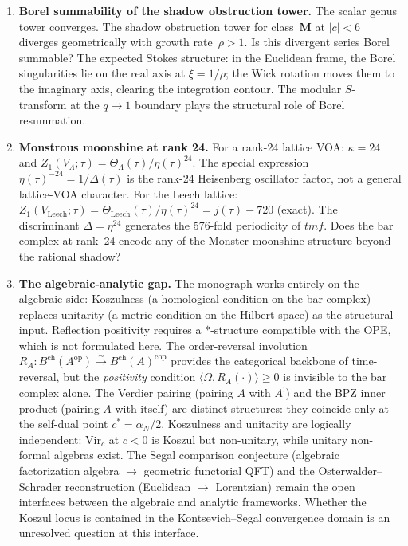 \documentclass[11pt]{article}
\begin{document}
\begin{enumerate}
  trisecant identity playing the role of the Arnold relation?
\item \textbf{Borel summability of the shadow obstruction tower.}
  The scalar genus tower converges.  The shadow obstruction tower for
  class~$\mathbf{M}$ at $|c| < 6$ diverges geometrically
  with growth rate~$\rho > 1$.  Is this divergent series Borel
  summable?  The expected Stokes structure: in the Euclidean
  frame, the Borel singularities lie on the real axis at
  $\xi = 1/\rho$; the Wick rotation moves them to the imaginary
  axis, clearing the integration contour.
  The modular $S$-transform at the $q \to 1$ boundary
  plays the structural role of Borel resummation.
\item \textbf{Monstrous moonshine at rank 24.}
  For a rank-24 lattice VOA: $\kappa = 24$ and
  $Z_1(V_\Lambda;\tau)=\Theta_\Lambda(\tau)/\eta(\tau)^{24}$.
  The special expression $\eta(\tau)^{-24}=1/\Delta(\tau)$ is the
  rank-24 Heisenberg oscillator factor, not a general lattice-VOA
  character.  For the Leech lattice:
  $Z_1(V_{\mathrm{Leech}};\tau)=\Theta_{\mathrm{Leech}}(\tau)/
  \eta(\tau)^{24}=j(\tau)-720$ (exact).  The discriminant $\Delta
  = \eta^{24}$ generates the 576-fold periodicity of $\mathit{tmf}$.
  Does the bar complex at rank~24 encode any of the Monster
  moonshine structure beyond the rational shadow?
\item \textbf{The algebraic-analytic gap.}
  The monograph works entirely on the algebraic side:
  Koszulness (a homological condition on the bar complex)
  replaces unitarity (a metric condition on the Hilbert space)
  as the structural input.  Reflection positivity requires a
  $*$-structure compatible with the OPE, which is not formulated
  here.  The order-reversal involution
  $R_A \colon B^{\mathrm{ch}}(A^{\mathrm{op}})
  \xrightarrow{\sim} B^{\mathrm{ch}}(A)^{\mathrm{cop}}$
  provides the categorical backbone of time-reversal, but the
  \emph{positivity} condition $\langle \Omega, R_A(\cdot)\rangle
  \ge 0$ is invisible to the bar complex alone.  The Verdier
  pairing (pairing $A$ with $A^!$) and the BPZ inner product
  (pairing $A$ with itself) are distinct structures: they
  coincide only at the self-dual point $c^* = \alpha_N/2$.
  Koszulness and unitarity are logically independent:
  $\mathrm{Vir}_c$ at $c < 0$ is Koszul but non-unitary, while
  unitary non-formal algebras exist.  The Segal comparison
  conjecture (algebraic factorization algebra $\to$ geometric
  functorial QFT) and the Osterwalder--Schrader reconstruction
  (Euclidean $\to$ Lorentzian) remain the open interfaces between
  the algebraic and analytic frameworks.  Whether the Koszul locus
  is contained in the Kontsevich--Segal convergence domain is an
  unresolved question at this interface.
\end{enumerate}
\end{document}
